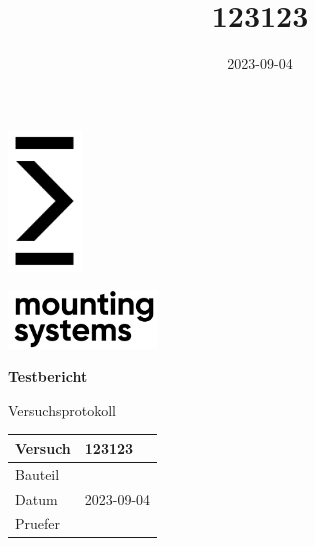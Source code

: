 \documentclass{article}%
\title{123123}%
\author{}%
\date{2023{-}09{-}04}%
\begin{document}
%
\normalsize%
\pagestyle{header}%

\begin{titlepage}
    \begin{minipage}[t][4cm][l]{0.4\textwidth}
        \includegraphics[width=75px]{MSG-Signet-Schwarz-CMYK-170414-02.png}
    \end{minipage}
    \hspace{2cm}
    \begin{minipage}[t][4cm][t]{0.4\textwidth}
        \includegraphics[width=150px]{MSG-Signet-Schwarz-CMYK-170414-01.png}
    \end{minipage}
    \begin{center}
    \begin{Huge}
        \textbf{Testbericht}\\
          
        
        \end{Huge}
        
    \vspace{3cm}
    \large{Versuchsprotokoll} \\
    \vspace{2cm}
    \large
    \begin{tabular}{| p{} | p{}|}
        \hline
            Versuch & 123123\\  \hline
             Bauteil  &   \\ \hline
             Datum & 2023-09-04\\ \hline
             Pruefer & \\ \hline
             
    \end{tabular}
\end{center}
\end{titlepage}
%
\newpage%
\tableofcontents%
\newpage%
\end{document}
